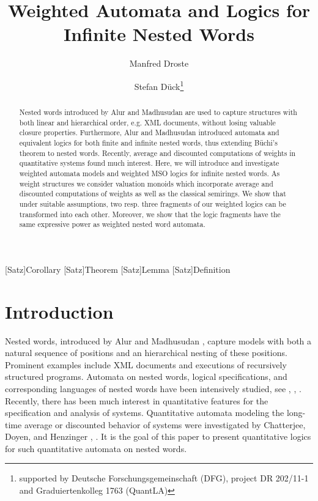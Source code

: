 \documentclass[runningheads, envcountsame, a4paper]{llncs}
\begin{document}
	
[Satz]{Corollary}{\bfseries}{\itshape}
[Satz]{Theorem}{\bfseries}{\itshape}
[Satz]{Lemma}{\bfseries}{\itshape}
[Satz]{Definition}{\bfseries}{\itshape}
\title{Weighted Automata and Logics for \\ Infinite Nested Words}
\author{Manfred Droste \and Stefan D\"uck\thanks{supported by Deutsche Forschungsgemeinschaft (DFG), project DR 202/11-1 and Graduiertenkolleg 1763 (QuantLA)}}
\maketitle
\begin{abstract}
Nested words introduced by Alur and Madhusudan are used to capture structures with both linear and hierarchical order, e.g. XML documents, without losing valuable closure properties. Furthermore, Alur and Madhusudan introduced automata and equivalent logics for both finite and infinite nested words, thus extending B\"uchi's theorem to nested words. Recently, average and discounted computations
of weights in quantitative systems found much interest.
Here, we will introduce and investigate weighted automata models
and weighted MSO logics for infinite nested words.
As weight structures we consider valuation monoids
which incorporate average and discounted computations of weights
as well as the classical semirings. We show that under suitable
assumptions, two resp. three fragments of our weighted logics
can be transformed into each other. Moreover, we show that
the logic fragments have the same expressive power as
weighted nested word automata.
\end{abstract}
	\section{Introduction}
Nested words, introduced by Alur and Madhusudan \cite{AM},
capture models with both a natural sequence of positions
and an hierarchical nesting of these positions.
Prominent examples include XML documents and executions of
recursively structured programs. Automata on nested words,
logical specifications, and corresponding languages of
nested words have been intensively studied, see \cite{AAB}, \cite{AM}, \cite{LMS}.
Recently, there has been much interest in quantitative features
for the specification and analysis of systems. Quantitative
automata modeling the long-time average or discounted behavior
of systems were investigated by Chatterjee, Doyen, and
Henzinger \cite{CDH}, \cite{CDH2}.
It is the goal of this paper to present quantitative logics for
such quantitative automata on nested words.
\end{document}
